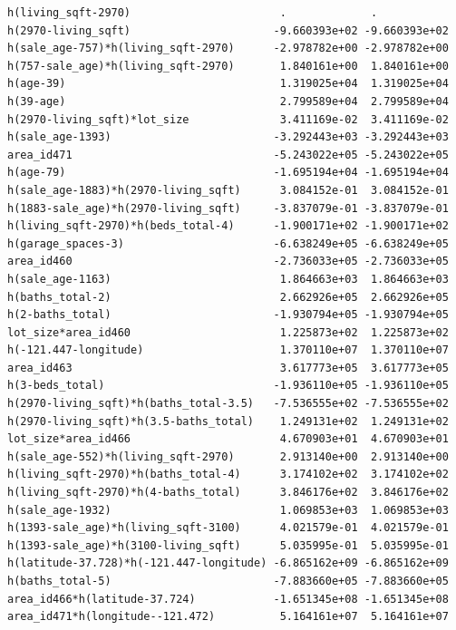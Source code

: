 \documentclass[
]{article}
\begin{document}
\begin{verbatim}
h(living_sqft-2970)                       .             .           
h(2970-living_sqft)                      -9.660393e+02 -9.660393e+02
h(sale_age-757)*h(living_sqft-2970)      -2.978782e+00 -2.978782e+00
h(757-sale_age)*h(living_sqft-2970)       1.840161e+00  1.840161e+00
h(age-39)                                 1.319025e+04  1.319025e+04
h(39-age)                                 2.799589e+04  2.799589e+04
h(2970-living_sqft)*lot_size              3.411169e-02  3.411169e-02
h(sale_age-1393)                         -3.292443e+03 -3.292443e+03
area_id471                               -5.243022e+05 -5.243022e+05
h(age-79)                                -1.695194e+04 -1.695194e+04
h(sale_age-1883)*h(2970-living_sqft)      3.084152e-01  3.084152e-01
h(1883-sale_age)*h(2970-living_sqft)     -3.837079e-01 -3.837079e-01
h(living_sqft-2970)*h(beds_total-4)      -1.900171e+02 -1.900171e+02
h(garage_spaces-3)                       -6.638249e+05 -6.638249e+05
area_id460                               -2.736033e+05 -2.736033e+05
h(sale_age-1163)                          1.864663e+03  1.864663e+03
h(baths_total-2)                          2.662926e+05  2.662926e+05
h(2-baths_total)                         -1.930794e+05 -1.930794e+05
lot_size*area_id460                       1.225873e+02  1.225873e+02
h(-121.447-longitude)                     1.370110e+07  1.370110e+07
area_id463                                3.617773e+05  3.617773e+05
h(3-beds_total)                          -1.936110e+05 -1.936110e+05
h(2970-living_sqft)*h(baths_total-3.5)   -7.536555e+02 -7.536555e+02
h(2970-living_sqft)*h(3.5-baths_total)    1.249131e+02  1.249131e+02
lot_size*area_id466                       4.670903e+01  4.670903e+01
h(sale_age-552)*h(living_sqft-2970)       2.913140e+00  2.913140e+00
h(living_sqft-2970)*h(baths_total-4)      3.174102e+02  3.174102e+02
h(living_sqft-2970)*h(4-baths_total)      3.846176e+02  3.846176e+02
h(sale_age-1932)                          1.069853e+03  1.069853e+03
h(1393-sale_age)*h(living_sqft-3100)      4.021579e-01  4.021579e-01
h(1393-sale_age)*h(3100-living_sqft)      5.035995e-01  5.035995e-01
h(latitude-37.728)*h(-121.447-longitude) -6.865162e+09 -6.865162e+09
h(baths_total-5)                         -7.883660e+05 -7.883660e+05
area_id466*h(latitude-37.724)            -1.651345e+08 -1.651345e+08
area_id471*h(longitude--121.472)          5.164161e+07  5.164161e+07
                                                                    

\end{verbatim}
\end{document}
